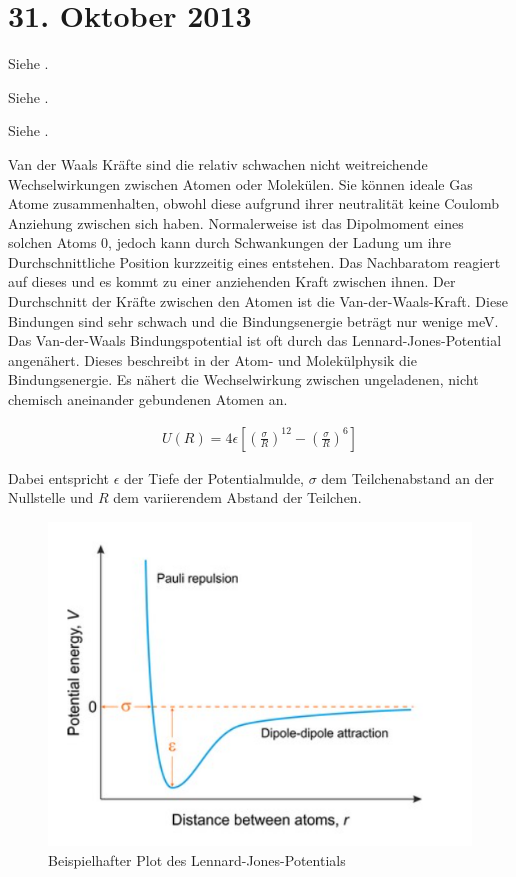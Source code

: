 \section{31. Oktober 2013}

\label{q:70}

Siehe .

\label{q:71}

Siehe .

\label{q:72}

Siehe .

\label{q:73}

Van der Waals Kräfte sind die relativ schwachen nicht weitreichende Wechselwirkungen zwischen Atomen oder Molekülen. Sie können ideale Gas Atome zusammenhalten, obwohl diese aufgrund ihrer neutralität keine Coulomb Anziehung zwischen sich haben.
Normalerweise ist das Dipolmoment eines solchen Atoms 0, jedoch kann durch Schwankungen der Ladung um ihre Durchschnittliche Position kurzzeitig eines entstehen. 
Das Nachbaratom reagiert auf dieses und es kommt zu einer anziehenden Kraft zwischen ihnen. Der Durchschnitt der Kräfte zwischen den Atomen ist die Van-der-Waals-Kraft. Diese Bindungen sind sehr schwach und die Bindungsenergie beträgt nur wenige meV.
Das Van-der-Waals Bindungspotential ist oft durch das Lennard-Jones-Potential angenähert. Dieses beschreibt in der Atom- und Molekülphysik die Bindungsenergie. Es nähert die Wechselwirkung zwischen ungeladenen, nicht chemisch aneinander gebundenen Atomen an.

\begin{align}
    U(R) = 4\epsilon\left[\left(\frac{\sigma}{R}\right)^{12} - \left(\frac{\sigma}{R}\right)^6\right]
\end{align}

Dabei entspricht $\epsilon$ der Tiefe der Potentialmulde, $\sigma$ dem Teilchenabstand an der Nullstelle und $R$ dem variierendem Abstand der Teilchen.

\begin{figure}[H]
    \includegraphics[width=0.8\linewidth]{resources/31-10-2013/lennard.PNG}
    \caption{Beispielhafter Plot des Lennard-Jones-Potentials}
\end{figure}

